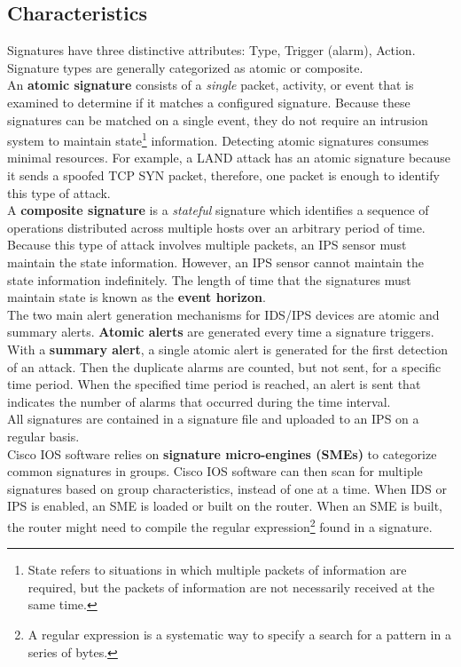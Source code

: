 \subsection{Characteristics}

Signatures have three distinctive attributes: Type, Trigger (alarm), Action. Signature types are generally categorized as atomic or composite.\\

An \textbf{atomic signature} consists of a \emph{single} packet, activity, or event that is examined to determine if it matches a configured signature. Because these signatures can be matched on a single event, they do not require an intrusion system to maintain state\footnote{State refers to situations in which multiple packets of information are required, but the packets of information are not necessarily received at the same time.} information. Detecting atomic signatures consumes minimal resources. For example, a LAND attack has an atomic signature because it sends a spoofed TCP SYN packet, therefore, one packet is enough to identify this type of attack.\\

A \textbf{composite signature} is a \emph{stateful} signature which identifies a sequence of operations distributed across multiple hosts over an arbitrary period of time. Because this type of attack involves multiple packets, an IPS sensor must maintain the state information. However, an IPS sensor cannot maintain the state information indefinitely. The length of time that the signatures must maintain state is known as the \textbf{event horizon}.\\

The two main alert generation mechanisms for IDS/IPS devices are atomic and summary alerts. \textbf{Atomic alerts} are generated every time a signature triggers. With a \textbf{summary alert}, a single atomic alert is generated for the first detection of an attack. Then the duplicate alarms are counted, but not sent, for a specific time period. When the specified time period is reached, an alert is sent that indicates the number of alarms that occurred during the time interval.\\

All signatures are contained in a signature file and uploaded to an IPS on a regular basis.\\

Cisco IOS software relies on \textbf{signature micro-engines (SMEs)} to categorize common signatures in groups. Cisco IOS software can then scan for multiple signatures based on group characteristics, instead of one at a time. When IDS or IPS is enabled, an SME is loaded or built on the router. When an SME is built, the router might need to compile the regular expression\footnote{A regular expression is a systematic way to specify a search for a pattern in a series of bytes.} found in a signature. \\

